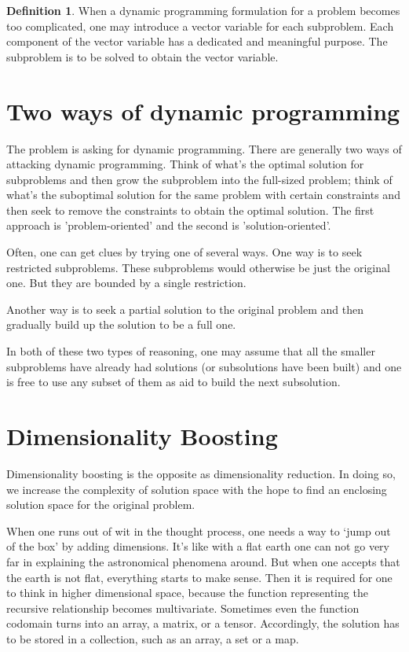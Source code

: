 \documentclass[oneside,11pt]{book}
\theoremstyle{definition}
\newtheorem{defn}{Definition}[section]
\theoremstyle{remark}
\begin{document}
\begin{defn}
    When a dynamic programming formulation for a problem becomes too complicated, one may
    introduce a vector variable for each subproblem.
    Each component of the vector variable has a dedicated and meaningful purpose.
    The subproblem is to be solved to obtain the vector variable.
\end{defn}

\section{Two ways of dynamic programming}\label{sec:twoWaysOfDynamicProgramming}

The problem is asking for dynamic programming.
There are generally two ways of attacking dynamic programming.
Think of what's the optimal solution for subproblems and then grow the subproblem into the
full-sized problem;
think of what's the suboptimal solution for the same problem with certain
constraints and then seek to remove the constraints to obtain the optimal solution.
The first approach is 'problem-oriented' and the second is 'solution-oriented'.

Often, one can get clues by trying one of several ways.
One way is to seek restricted subproblems.
These subproblems would otherwise be just the original one.
But they are bounded by a single restriction.

Another way is to seek a partial solution to the original problem and then gradually build up the
solution to be a full one.

In both of these two types of reasoning, one may assume that all the smaller subproblems
have already had solutions (or subsolutions have been built) and one is free to use any subset of
them as aid to build the next subsolution.

\section{Dimensionality Boosting}\label{sec:dimensionality-boosting}

Dimensionality boosting is the opposite as dimensionality reduction.
In doing so, we increase the complexity of solution space with the hope to find an enclosing
solution space for the original problem.

When one runs out of wit in the thought process, one needs a way to `jump out of the
box' by adding dimensions.
It's like with a flat earth one can not go very far in explaining the astronomical phenomena
around.
But when one accepts that the earth is not flat, everything starts to make sense.
Then it is required for one to think in higher dimensional space, because the function
representing the recursive relationship becomes multivariate.
Sometimes even the function codomain turns into an array, a matrix, or a tensor.
Accordingly, the solution has to be stored in a collection, such as an array, a set or a map.
\end{document}
